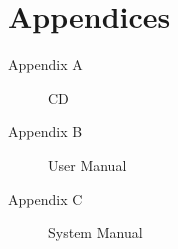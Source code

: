 \section*{Appendices}

\begin{description}
    \item[Appendix A] CD
    \item[Appendix B] User Manual
    \item[Appendix C] System Manual
\end{description}





